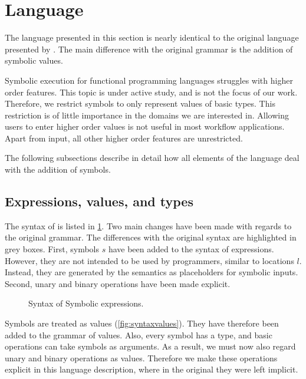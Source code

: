 
\section{Language}
\label{sec:language}

The language presented in this section is nearly identical to the original \TOPHAT language presented by \citet{DBLP:conf/ppdp/SteenvoordenNK19}.
The main difference with the original grammar is the addition of symbolic values.

Symbolic execution for functional programming languages struggles with higher order features.
This topic is under active study, and is not the focus of our work.
Therefore, we restrict symbols to only represent values of basic types.
This restriction is of little importance in the domains we are interested in.
Allowing users to enter higher order values is not useful in most workflow applications.
Apart from input, all other higher order features are unrestricted.

The following subsections describe in detail how all elements of the \TOPHAT language deal with the addition of symbols.



\subsection{Expressions, values, and types}
\label{sec:expressions}

The syntax of \TOPHAT is listed in \cref{fig:syntaxtophat}.
Two main changes have been made with regards to the original \TOPHAT grammar.
The differences with the original syntax are highlighted in grey boxes.
First, symbols $s$ have been added to the syntax of expressions.
However, they are not intended to be used by programmers, similar to locations $l$.
Instead, they are generated by the semantics as placeholders for symbolic inputs.
Second, unary and binary operations have been made explicit.

\begin{figure}[ht]
  \small
  \caption{Syntax of Symbolic \TOPHAT expressions.}
  \label{fig:syntaxtophat}
\end{figure}

Symbols are treated as values (\cref{fig:syntaxvalues}).
They have therefore been added to the grammar of values.
Also, every symbol has a type, and basic operations can take symbols as arguments.
As a result, we must now also regard unary and binary operations as values.
Therefore we make these operations explicit in this language description,
where in the original they were left implicit.

